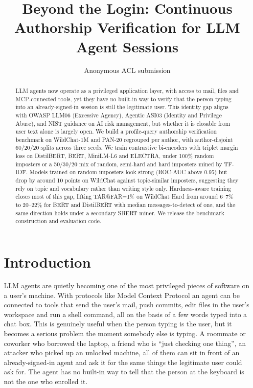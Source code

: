\documentclass[11pt]{article}
\title{Beyond the Login: Continuous Authorship Verification for LLM Agent Sessions}
\author{Anonymous ACL submission}
\begin{document}
\maketitle
\begin{abstract}
LLM agents now operate as a privileged application layer, with access to mail, files and MCP-connected tools, yet they have no built-in way to verify that the person typing into an already-signed-in session is still the legitimate user. This identity gap aligns with OWASP LLM06 (Excessive Agency), Agentic ASI03 (Identity and Privilege Abuse), and NIST guidance on AI risk management, but whether it is closable from user text alone is largely open. We build a profile-query authorship verification benchmark on WildChat-1M and PAN-20 regrouped per author, with author-disjoint 60/20/20 splits across three seeds. We train contrastive bi-encoders with triplet margin loss on DistilBERT, BERT, MiniLM-L6 and ELECTRA, under 100\% random imposters or a 50/30/20 mix of random, semi-hard and hard imposters mined by TF-IDF. Models trained on random imposters look strong (ROC-AUC above 0.95) but drop by around 10 points on WildChat against topic-similar imposters, suggesting they rely on topic and vocabulary rather than writing style only. Hardness-aware training closes most of this gap, lifting TAR@FAR=1\% on WildChat Hard from around 6--7\% to 20--22\% for BERT and DistilBERT with median messages-to-detect of one, and the same direction holds under a secondary SBERT miner. We release the benchmark construction and evaluation code.
\end{abstract}

\section{Introduction}
\label{sec:intro}

LLM agents are quietly becoming one of the most privileged pieces of software on a user's machine. With protocols like Model Context Protocol \citep{anthropic2024mcp} an agent can be connected to tools that send the user's mail, push commits, edit files in the user's workspace and run a shell command, all on the basis of a few words typed into a chat box. This is genuinely useful when the person typing is the user, but it becomes a serious problem the moment somebody else is typing. A roommate or coworker who borrowed the laptop, a friend who is ``just checking one thing'', an attacker who picked up an unlocked machine, all of them can sit in front of an already-signed-in agent and ask it for the same things the legitimate user could ask for. The agent has no built-in way to tell that the person at the keyboard is not the one who enrolled it.
\end{document}
